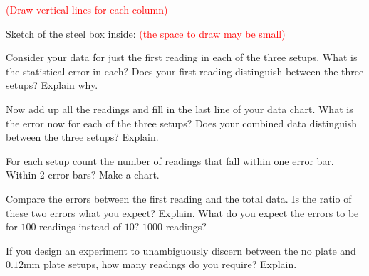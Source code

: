 \documentclass[addpoints]{physlabs}  %
\begin{document}
\begin{postlab}
\textcolor{red}{(Draw vertical lines for each column)}

Sketch of the steel box inside:
\vfill
\textcolor{red}{(the space to draw may be small)}
\newpage

\question[2] Consider your data for just the first reading in each of the three setups. What is the statistical error in each? Does your first reading distinguish between the three setups? Explain why.

\question[2] Now add up all the readings and fill in the last line of your data chart. What is the error now for each of the three setups? Does your combined data distinguish between the three setups? Explain.

\question[2] For each setup count the number of readings that fall within one error bar. Within 2 error bars? Make a chart.

\question[3] Compare the errors between the first reading and the total data. Is the ratio of these two errors what you expect?
Explain.
What do you expect the errors to be for $100$ readings instead of $10$? $1000$ readings?

\question[1] If you design an experiment to unambiguously discern between the no plate and $0.12$mm plate setups, how many readings do you require? Explain.


\end{postlab}
\end{document}
